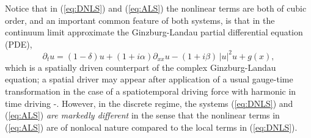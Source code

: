 \documentclass[preprintnumbers,amsmath,amssymb]{revtex4}
\begin{document}
Notice that in (\ref{eq:DNLS}) and (\ref{eq:ALS}) the nonlinear terms are both of cubic order, and an important common feature of both systems, is that in 
the continuum limit approximate the 
Ginzburg-Landau partial differential equation (PDE),
\begin{equation}
\partial_t u=(1-\delta)u+(1+i\alpha)
\partial_{xx} u -(1+i\beta)\,|u|^2u+g(x),\label{eq:CGL}
\end{equation} 
which is a spatially driven counterpart of the complex Ginzburg-Landau equation; a spatial driver may appear after application of a usual gauge-time transformation in the case of a spatiotemporal driving force with harmonic in time driving  \cite{dGLE1}-\cite{dGLE5}.
However, in the discrete regime, the systems (\ref{eq:DNLS}) and (\ref{eq:ALS})  {\em are markedly different} in the sense that the nonlinear terms in (\ref{eq:ALS}) are of nonlocal nature compared to the local terms in (\ref{eq:DNLS}). 
\end{document}
